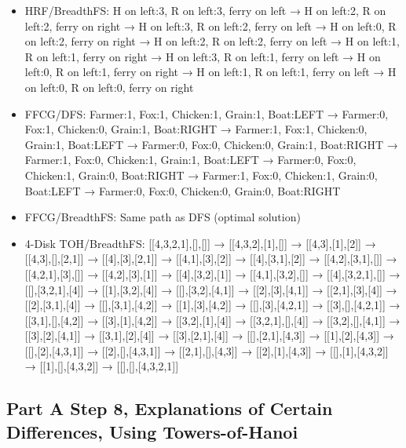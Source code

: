 \documentclass{article}
\begin{document}
 \begin{itemize}
 \item HRF/BreadthFS: 
 H on left:3, R on left:3, ferry on left → 
 H on left:2, R on left:2, ferry on right → 
 H on left:3, R on left:2, ferry on left → 
 H on left:0, R on left:2, ferry on right → 
 H on left:2, R on left:2, ferry on left → 
 H on left:1, R on left:1, ferry on right → 
 H on left:3, R on left:1, ferry on left → 
 H on left:0, R on left:1, ferry on right → 
 H on left:1, R on left:1, ferry on left → 
 H on left:0, R on left:0, ferry on right
 \item FFCG/DFS: 
 Farmer:1, Fox:1, Chicken:1, Grain:1, Boat:LEFT → 
 Farmer:0, Fox:1, Chicken:0, Grain:1, Boat:RIGHT → 
 Farmer:1, Fox:1, Chicken:0, Grain:1, Boat:LEFT → 
 Farmer:0, Fox:0, Chicken:0, Grain:1, Boat:RIGHT → 
 Farmer:1, Fox:0, Chicken:1, Grain:1, Boat:LEFT → 
 Farmer:0, Fox:0, Chicken:1, Grain:0, Boat:RIGHT → 
 Farmer:1, Fox:0, Chicken:1, Grain:0, Boat:LEFT → 
 Farmer:0, Fox:0, Chicken:0, Grain:0, Boat:RIGHT
 \item FFCG/BreadthFS: Same path as DFS (optimal solution)
 \item 4-Disk TOH/BreadthFS: 
 [[4,3,2,1],[],[]] → [[4,3,2],[1],[]] → [[4,3],[1],[2]] → [[4,3],[],[2,1]] → [[4],[3],[2,1]] → [[4,1],[3],[2]] → [[4],[3,1],[2]] → [[4,2],[3,1],[]] → [[4,2,1],[3],[]] → [[4,2],[3],[1]] → [[4],[3,2],[1]] → [[4,1],[3,2],[]] → [[4],[3,2,1],[]] → [[],[3,2,1],[4]] → [[1],[3,2],[4]] → [[],[3,2],[4,1]] → [[2],[3],[4,1]] → [[2,1],[3],[4]] → [[2],[3,1],[4]] → [[],[3,1],[4,2]] → [[1],[3],[4,2]] → [[],[3],[4,2,1]] → [[3],[],[4,2,1]] → [[3,1],[],[4,2]] → [[3],[1],[4,2]] → [[3,2],[1],[4]] → [[3,2,1],[],[4]] → [[3,2],[],[4,1]] → [[3],[2],[4,1]] → [[3,1],[2],[4]] → [[3],[2,1],[4]] → [[],[2,1],[4,3]] → [[1],[2],[4,3]] → [[],[2],[4,3,1]] → [[2],[],[4,3,1]] → [[2,1],[],[4,3]] → [[2],[1],[4,3]] → [[],[1],[4,3,2]] → [[1],[],[4,3,2]] → [[],[],[4,3,2,1]]
 \end{itemize}

 \subsection{Part A Step 8,  Explanations of Certain Differences, Using Towers-of-Hanoi  }
\end{document}
